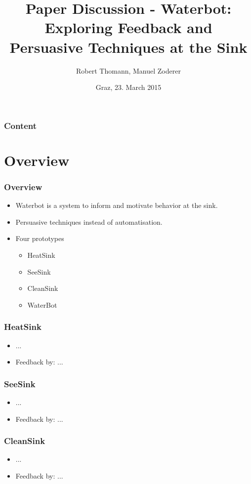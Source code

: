 \documentclass{beamer}
\title[Waterbot]{Paper Discussion -  Waterbot:\\Exploring Feedback and \\Persuasive Techniques at the Sink}
\author{Robert Thomann, Manuel Zoderer}
\date{Graz, 23. March 2015}		%
\begin{document}
\titleframe

\begin{frame}
  \frametitle{Content}
  \tableofcontents%
\end{frame}





\section{Overview}
\begin{frame}
	\frametitle{Overview}
	\begin{itemize}
	  \item Waterbot is a system to inform and motivate behavior at the sink.
            \item Persuasive techniques instead of automatisation.
          \item Four prototypes
	    \begin{itemize}
              \item HeatSink
              \item SeeSink
              \item CleanSink
              \item WaterBot
            \end{itemize}          
        \end{itemize}          

\end{frame}


\begin{frame}
	\frametitle{HeatSink}
	\begin{itemize}
	  \item ...
          \item Feedback by: ...
        \end{itemize}          

\end{frame}


\begin{frame}
	\frametitle{SeeSink}
	\begin{itemize}
	  \item ...
          \item Feedback by: ...
        \end{itemize}          

\end{frame}


\begin{frame}
	\frametitle{CleanSink}
	\begin{itemize}
	  \item ...
          \item Feedback by: ...
        \end{itemize}          

\end{frame}
\end{document}
